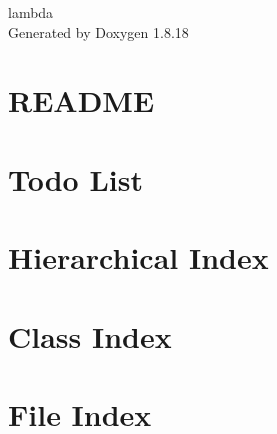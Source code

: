 \let\mypdfximage\pdfximage\def\pdfximage{\immediate\mypdfximage}\documentclass[twoside]{book}
\newcommand{\+}{\discretionary{\mbox{\scriptsize$\hookleftarrow$}}{}{}}
\newcommand{\clearemptydoublepage}{%
  \newpage{\pagestyle{empty}\cleardoublepage}%
}
\begin{document}
\hypersetup{pageanchor=false,
             bookmarksnumbered=true,
             pdfencoding=unicode
            }
\begin{titlepage}
\vspace*{7cm}
\begin{center}%
{\Large lambda }\\
\vspace*{1cm}
{\large Generated by Doxygen 1.8.18}\\
\end{center}
\end{titlepage}
\clearemptydoublepage
{}
\tableofcontents
\clearemptydoublepage
{}
\hypersetup{pageanchor=true}

\chapter{R\+E\+A\+D\+ME}
\label{index}\hypertarget{index}{}
\chapter{Todo List}
\label{todo}

\chapter{Hierarchical Index}

\chapter{Class Index}

\chapter{File Index}

\end{document}

